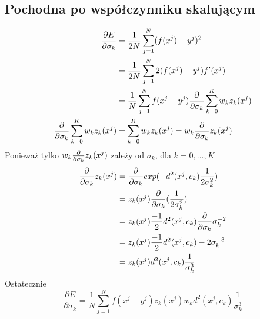 \documentclass[a4paper, portrait,11pt]{article}
\begin{document}
\subsection{Pochodna po współczynniku skalującym}
\begin{align}
  \frac{\partial E}{\partial{\sigma_{k}}}&= \frac{1}{2N} \sum_{j=1}^{N} (f(x^j) - y^j)^2\\
  &= \frac{1}{2N} \sum_{j=1}^{N} 2 (f(x^j) - y^j) f'(x^j)\\
  &= \frac{1}{N} \sum_{j=1}^{N} f(x^j - y^j) \frac{\partial}{\partial{\sigma_{k}}} \sum_{k=0}^{K} w_k z_k(x^j)\\
  \frac{\partial}{\partial{\sigma_{k}}} \sum_{k=0}^{K} w_k z_k(x^j) &= \sum_{k=0}^{K} w_k z_k(x^j) =  w_k \frac{\partial}{\partial{\sigma_{k}}}z_k(x^j)
\end{align}
Ponieważ tylko $w_k \frac{\partial}{\partial{\sigma_{k}}} z_k(x^j)$ zależy od $\sigma_k$, dla $k=0, ..., K$
\begin{align}
  \frac{\partial}{\partial{\sigma_{k}}}z_k(x^j) &= \frac{\partial}{\partial{\sigma_{k}}} exp(-d^2(x^j, c_k) \frac{1}{2\sigma_k^2})\\
  &= z_k(x^j) \frac{\partial}{\partial{\sigma_{k}}} ( \frac{1}{2\sigma_k^2}) \\
  &= z_k(x^j) \frac{-1}{2} d^2(x^j, c_k) \frac{\partial}{\partial{\sigma_{k}}} {\sigma_k^{-2}}\\
  &= z_k(x^j) \frac{-1}{2} d^2(x^j, c_k) -2 \sigma_k^{-3}\\
  &= z_k(x^j) d^2(x^j, c_k) \frac{1}{\sigma_k^3}
\end{align}
Ostatecznie
\begin{equation}
  \frac{\partial E}{\partial{\sigma_{k}}} = \frac{1}{N} \sum_{j=1}^{N} f(x^j - y^j) z_k(x^j) w_k d^2(x^j, c_k) \frac{1}{\sigma_k^3}
\end{equation}
\end{document}
